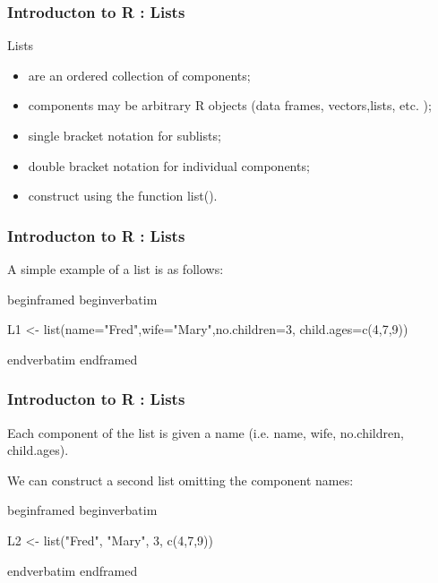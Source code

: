 
\begin{frame}[fragile]
\frametitle{Introducton to R : Lists}
Lists

\begin{itemize}

\item are an ordered collection of components;
\item	components may be arbitrary R objects (data frames, vectors,lists, etc. );
\item single bracket notation for sublists;
\item	double bracket notation for individual components;
\item	construct using the function list().
\end{itemize}

\end{frame}
\begin{frame}[fragile]
\frametitle{Introducton to R : Lists}
A simple example of a list is as follows:

begin{framed}
begin{verbatim}

L1 <- list(name="Fred",wife="Mary",no.children=3,
child.ages=c(4,7,9))

end{verbatim}
end{framed}
\end{frame}
\begin{frame}[fragile]
\frametitle{Introducton to R : Lists}
Each component of the list is given a name (i.e. name, wife, no.children, child.ages).

We can construct a second list omitting the component names:

begin{framed}
begin{verbatim}

L2 <- list("Fred", "Mary", 3, c(4,7,9))

end{verbatim}
end{framed}
\end{frame}
